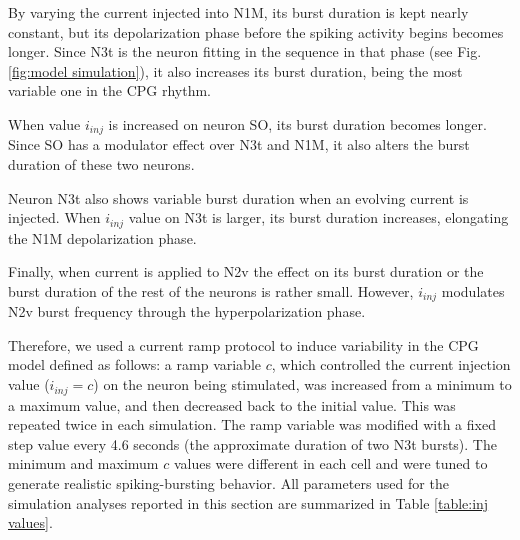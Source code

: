 By varying the current injected into N1M, its burst duration is kept nearly constant, but its depolarization phase before the spiking activity begins becomes longer. Since N3t is the neuron fitting in the sequence in that phase (see Fig. \ref{fig:model simulation}), it also increases its burst duration, being the most variable one in the CPG rhythm. 

When value \(i_{inj}\) is increased on neuron SO, its burst duration becomes longer. Since SO has a modulator effect over N3t and N1M, it also alters the burst duration of these two neurons.

Neuron N3t also shows variable burst duration when an evolving current is injected. When \(i_{inj}\) value on N3t is larger, its burst duration increases, elongating the N1M depolarization phase.  

Finally, when current is applied to N2v the effect on its burst duration or the burst duration of the rest of the neurons is rather small. However, \(i_{inj}\) %
modulates N2v burst frequency through the hyperpolarization phase. 

Therefore, we used a current ramp protocol to induce variability in the CPG model defined as follows: a ramp variable $c$, which controlled the current injection value ($i_{inj}=c$) on the neuron being stimulated, was increased from a minimum to a maximum value, and then decreased back to the initial value. This was repeated twice in each simulation. The ramp variable was modified with a fixed step value every 4.6 seconds (the approximate duration of two N3t bursts). The minimum and maximum $c$ values were different in each cell and were tuned to generate realistic spiking-bursting behavior. All parameters used for the simulation analyses reported in this section are summarized in Table \ref{table:inj values}.

